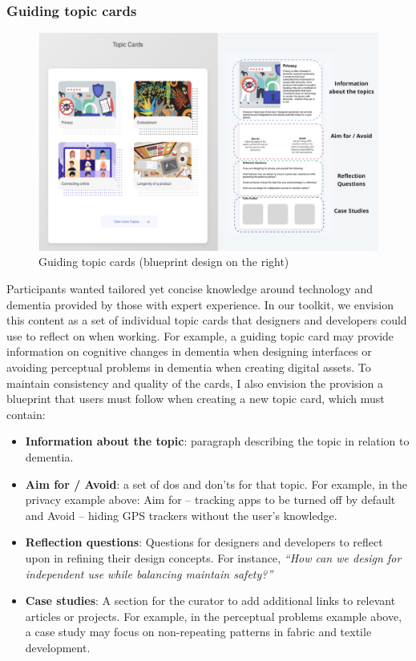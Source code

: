 \subsubsection{Guiding topic cards}
\begin{figure}[h]
\centering
\includegraphics[width=1\linewidth]{Images/D3Toolkit/Fig9.png}
\caption{Guiding topic cards (blueprint design on the right)}
\label{fig:topicCards}
\end{figure}
Participants wanted tailored yet concise knowledge around technology and dementia provided by those with expert experience. In our toolkit, we envision this content as a set of individual topic cards that designers and developers could use to reflect on when working. For example, a guiding topic card may provide information on cognitive changes in dementia when designing interfaces or avoiding perceptual problems in dementia when creating digital assets. To maintain consistency and quality of the cards, I also envision the provision a blueprint that users must follow when creating a new topic card, which must contain:
\begin{itemize}
    \item \textbf{Information about the topic}: paragraph describing the topic in relation to dementia.
    \item \textbf{Aim for / Avoid}: a set of dos and don’ts for that topic. For example, in the privacy example above: Aim for – tracking apps to be turned off by default and Avoid – hiding GPS trackers without the user’s knowledge. 
    \item \textbf{Reflection questions}: Questions for designers and developers to reflect upon in refining their design concepts. For instance,\textit{ “How can we design for independent use while balancing maintain safety?”}
    \item \textbf{Case studies}: A section for the curator to add additional links to relevant articles or projects. For example, in the perceptual problems example above, a case study may focus on non-repeating patterns in fabric and textile development.
\end{itemize}

